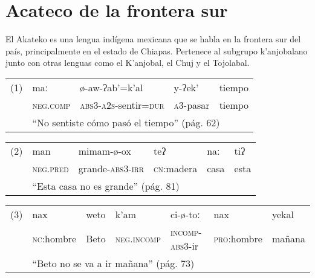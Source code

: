 \section*{Acateco de la frontera sur}

\noindent El Akateko es una lengua indígena mexicana que se habla en la frontera sur del país, principalmente en el estado de Chiapas. Pertenece al subgrupo k'anjobalano junto con otras lenguas como el K'anjobal, el Chuj y el Tojolabal. \vspace{0.3cm}


{\noindent \setmainfont{Doulos SIL}
      \begin{tabular}{lllll}
            (1) & maː                                                             & ø-aw-ʔab'=k'al                        & y-ʔek'            & tiempo \\
                & \textsc{neg.comp}                                               & \textsc{abs3-a2s}-sentir\textsc{=dur} & \textsc{a3}-pasar & tiempo \\
                & \multicolumn{4}{l}{“No sentiste cómo pasó el tiempo” (pág. 62)}                                                                      \\
      \end{tabular} \vspace{0.25cm}

      \noindent \begin{tabular}{llllll}
            (2) & man                                                    & mimam-ø-ox               & teʔ                & naː  & tiʔ  \\
                & \textsc{neg.pred}                                      & grande-\textsc{abs3-irr} & \textsc{cn}:madera & casa & esta \\
                & \multicolumn{5}{l}{“Esta casa no es grande” (pág. 81)}                                                               \\
      \end{tabular} \vspace{0.25cm}

      \noindent \begin{tabular}{lllllll}
            (3) & nax                                                       & weto & k'am                & ci-ø-toː                & nax                 & yekal  \\
                & \textsc{nc}:hombre                                        & Beto & \textsc{neg.incomp} & \textsc{incomp-abs3}-ir & \textsc{pro}:hombre & mañana \\
                & \multicolumn{6}{l}{“Beto no se va a ir mañana” (pág. 73)}                                                                                       \\
      \end{tabular} \vspace{0.25cm}

}
